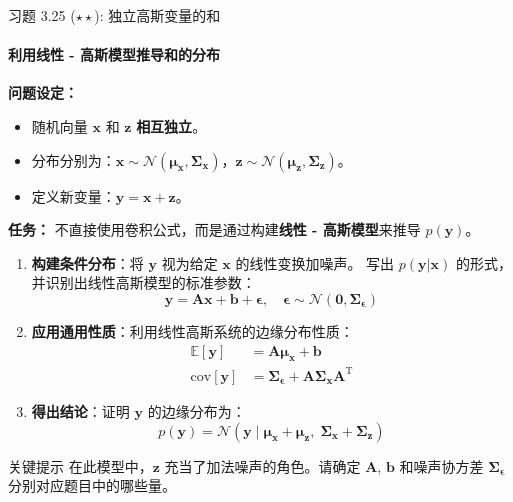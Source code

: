 \documentclass[12pt, aspectratio=169]{beamer}
\begin{document}
\begin{frame}[allowframebreaks]{习题 3.25 ($\star\star$): 独立高斯变量的和}
    \framesubtitle{利用线性 - 高斯模型推导和的分布}
    
    \textbf{问题设定：}
    \begin{itemize}
        \item 随机向量 $\mathbf{x}$ 和 $\mathbf{z}$ \textbf{相互独立}。
        \item 分布分别为：$\mathbf{x} \sim \mathcal{N}(\boldsymbol{\mu}_{\mathbf{x}}, \boldsymbol{\Sigma}_{\mathbf{x}})$，$\mathbf{z} \sim \mathcal{N}(\boldsymbol{\mu}_{\mathbf{z}}, \boldsymbol{\Sigma}_{\mathbf{z}})$。
        \item 定义新变量：$\mathbf{y} = \mathbf{x} + \mathbf{z}$。
    \end{itemize}

    \vspace{0.5em}
    \textbf{任务：}
    不直接使用卷积公式，而是通过构建\textbf{线性 - 高斯模型}来推导 $p(\mathbf{y})$。
    
    \begin{enumerate}
        \item \textbf{构建条件分布}：将 $\mathbf{y}$ 视为给定 $\mathbf{x}$ 的线性变换加噪声。
        写出 $p(\mathbf{y}|\mathbf{x})$ 的形式，并识别出线性高斯模型的标准参数：
        $$ \mathbf{y} = \mathbf{A}\mathbf{x} + \mathbf{b} + \boldsymbol{\epsilon}, \quad \boldsymbol{\epsilon} \sim \mathcal{N}(\mathbf{0}, \boldsymbol{\Sigma}_{\boldsymbol{\epsilon}}) $$
        \item \textbf{应用通用性质}：利用线性高斯系统的边缘分布性质：
        \begin{align*}
            \mathbb{E}[\mathbf{y}] &= \mathbf{A}\boldsymbol{\mu}_{\mathbf{x}} + \mathbf{b} \\
            \textrm{cov}[\mathbf{y}] &= \boldsymbol{\Sigma}_{\boldsymbol{\epsilon}} + \mathbf{A}\boldsymbol{\Sigma}_{\mathbf{x}}\mathbf{A}^\mathrm{T}
        \end{align*}
        \item \textbf{得出结论}：证明 $\mathbf{y}$ 的边缘分布为：
        \begin{equation*}
            p(\mathbf{y}) = \mathcal{N}(\mathbf{y} \mid \boldsymbol{\mu}_{\mathbf{x}} + \boldsymbol{\mu}_{\mathbf{z}}, \; \boldsymbol{\Sigma}_{\mathbf{x}} + \boldsymbol{\Sigma}_{\mathbf{z}})
        \end{equation*}
    \end{enumerate}

    \begin{alertblock}{关键提示}
        在此模型中，$\mathbf{z}$ 充当了加法噪声的角色。请确定 $\mathbf{A}$, $\mathbf{b}$ 和噪声协方差 $\boldsymbol{\Sigma}_{\boldsymbol{\epsilon}}$ 分别对应题目中的哪些量。
    \end{alertblock}
\end{frame}
\end{document}
